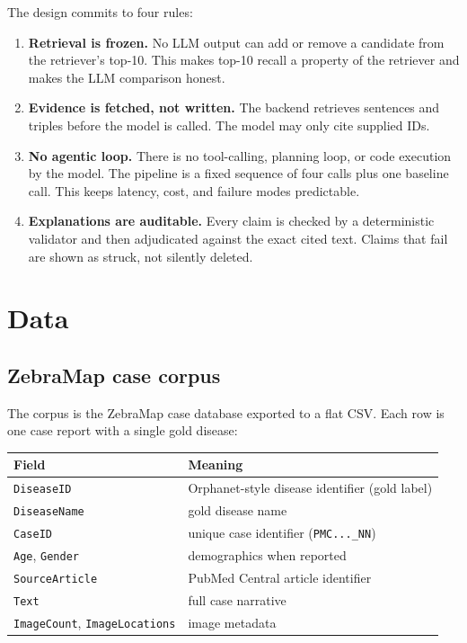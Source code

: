 \documentclass[11pt,a4paper]{article}
\newcommand{\code}[1]{\texttt{\small #1}}
\newcommand{\key}[1]{\textbf{#1}}
\begin{document}
The design commits to four rules:

\begin{enumerate}[leftmargin=1.4em]
\item \key{Retrieval is frozen.} No LLM output can add or remove a candidate from
the retriever's top-10. This makes top-10 recall a property of the retriever and
makes the LLM comparison honest.
\item \key{Evidence is fetched, not written.} The backend retrieves sentences and
triples before the model is called. The model may only cite supplied IDs.
\item \key{No agentic loop.} There is no tool-calling, planning loop, or code
execution by the model. The pipeline is a fixed sequence of four calls plus one
baseline call. This keeps latency, cost, and failure modes predictable.
\item \key{Explanations are auditable.} Every claim is checked by a deterministic
validator and then adjudicated against the exact cited text. Claims that fail are
shown as struck, not silently deleted.
\end{enumerate}

\section{Data}

\subsection{ZebraMap case corpus}

The corpus is the ZebraMap case database exported to a flat CSV. Each row is one
case report with a single gold disease:

\begin{center}
\begin{tabular}{ll}
\toprule
Field & Meaning\\
\midrule
\code{DiseaseID} & Orphanet-style disease identifier (gold label)\\
\code{DiseaseName} & gold disease name\\
\code{CaseID} & unique case identifier (\code{PMC...\_NN})\\
\code{Age}, \code{Gender} & demographics when reported\\
\code{SourceArticle} & PubMed Central article identifier\\
\code{Text} & full case narrative\\
\code{ImageCount}, \code{ImageLocations} & image metadata\\
\bottomrule
\end{tabular}
\end{center}
\end{document}
